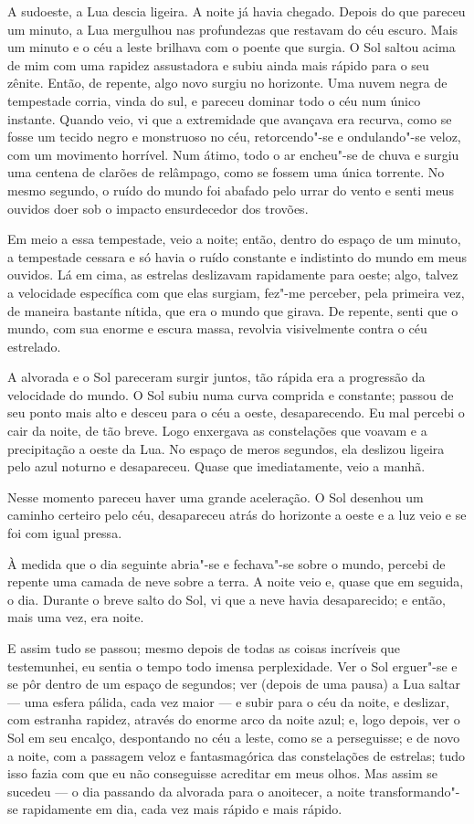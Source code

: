 A sudoeste, a Lua descia ligeira. A noite já havia chegado. Depois do que pareceu um minuto, a Lua mergulhou nas
profundezas que restavam do céu escuro. Mais um minuto e o céu a leste brilhava com o poente que surgia. O Sol saltou
acima de mim com uma rapidez assustadora e subiu ainda mais rápido para o seu zênite. Então, de repente, algo novo
surgiu no horizonte. Uma nuvem negra de tempestade corria, vinda do sul, e pareceu dominar todo o céu num único
instante. Quando veio, vi que a extremidade que avançava era recurva, como se fosse um tecido negro e monstruoso no
céu, retorcendo"-se e ondulando"-se veloz, com um movimento horrível. Num átimo, todo o ar encheu"-se de chuva e
surgiu uma centena de clarões de relâmpago, como se fossem uma única torrente. No mesmo segundo, o ruído do mundo foi
abafado pelo urrar do vento e senti meus ouvidos doer sob o impacto ensurdecedor dos trovões.

Em meio a essa tempestade, veio a noite; então, dentro do espaço de um minuto, a tempestade cessara e só havia o
ruído constante e indistinto do mundo em meus ouvidos. Lá em cima, as estrelas deslizavam rapidamente para oeste;
algo, talvez a velocidade específica com que elas surgiam, fez"-me perceber, pela primeira vez, de maneira bastante
nítida, que era o mundo que girava. De repente, senti que o mundo, com sua enorme e escura massa, revolvia visivelmente
contra o céu estrelado.

A alvorada e o Sol pareceram surgir juntos, tão rápida era a progressão da velocidade do mundo. O Sol subiu numa curva
comprida e constante; passou de seu ponto mais alto e desceu para o céu a oeste, desaparecendo. Eu mal percebi o cair
da noite, de tão breve. Logo enxergava as constelações que voavam e a precipitação a oeste da Lua. No espaço de meros
segundos, ela deslizou ligeira pelo azul noturno e desapareceu. Quase que imediatamente, veio a manhã.

Nesse momento pareceu haver uma grande aceleração. O Sol desenhou um caminho certeiro pelo céu, desapareceu atrás do
horizonte a oeste e a luz veio e se foi com igual pressa.

À medida que o dia seguinte abria"-se e fechava"-se sobre o mundo, percebi de repente uma camada de neve sobre a terra. A
noite veio e, quase que em seguida, o dia. Durante o breve salto do Sol, vi que a neve havia desaparecido; e então,
mais uma vez, era noite.

E assim tudo se passou; mesmo depois de todas as coisas incríveis que testemunhei, eu sentia o tempo todo imensa
perplexidade. Ver o Sol erguer"-se e se pôr dentro de um espaço de segundos; ver (depois de uma pausa) a Lua saltar ---
uma esfera pálida, cada vez maior --- e subir para o céu da noite, e deslizar, com estranha rapidez, através do enorme
arco da noite azul; e, logo depois, ver o Sol em seu encalço, despontando no céu a leste, como se a perseguisse; e
de novo a noite, com a passagem veloz e fantasmagórica das constelações de estrelas; tudo isso fazia com que eu não
conseguisse acreditar em meus olhos. Mas assim se sucedeu --- o dia passando da alvorada para o anoitecer, a
noite transformando"-se rapidamente em dia, cada vez mais rápido e mais rápido.

